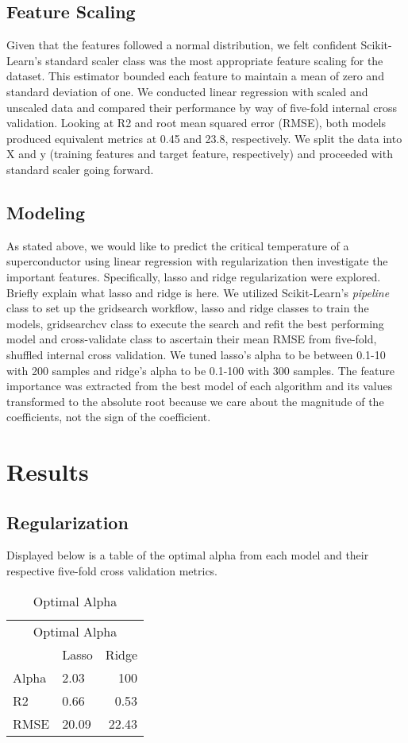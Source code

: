 \documentclass[twoside,twocolumn]{article}
\begin{document}
\subsection{Feature Scaling}
Given that the features followed a normal distribution, we felt confident Scikit-Learn’s standard scaler class was the most appropriate feature scaling for the dataset. This estimator bounded each feature to maintain a mean of zero and standard deviation of one. We conducted linear regression with scaled and unscaled data and compared their performance by way of five-fold internal cross validation. Looking at R2 and root mean squared error (RMSE), both models produced equivalent metrics at 0.45 and 23.8, respectively. We split the data into X and y (training features and target feature, respectively) and proceeded with standard scaler going forward.

\subsection{Modeling}
As stated above, we would like to predict the critical temperature of a superconductor using linear regression with regularization then investigate the important features. Specifically, lasso and ridge regularization were explored. Briefly explain what lasso and ridge is here.
We utilized Scikit-Learn’s \emph{pipeline} class to set up the gridsearch workflow, lasso and ridge classes to train the models, gridsearchcv class to execute the search and refit the best performing model and cross-validate class to ascertain their mean RMSE from five-fold, shuffled internal cross validation. We tuned lasso’s alpha to be between 0.1-10 with 200 samples and ridge’s alpha to be 0.1-100 with 300 samples. The feature importance was extracted from the best model of each algorithm and its values transformed to the absolute root because we care about the magnitude of the coefficients, not the sign of the coefficient.



\section{Results}

\subsection{Regularization}
Displayed below is a table of the optimal alpha from each model and their respective five-fold cross validation metrics.\\
\begin{table}[h!]
\centering
\begin{tabular}{llr}
\toprule
\multicolumn{3}{c}{Optimal Alpha} \\
\cmidrule(r){1-3}
        & Lasso & Ridge \\ \midrule
Alpha   & 2.03 & 100 \\
R2      & 0.66 & 0.53 \\
RMSE    & 20.09 & 22.43 \\ \bottomrule
\end{tabular}
\caption{Optimal Alpha}
\end{table}
\end{document}

